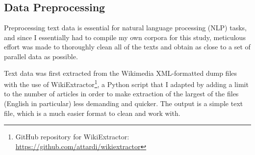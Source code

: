 \documentclass[12pt,a4paper]{article}
\numberwithin{figure}{section}
\numberwithin{table}{section}
\numberwithin{definition}{section}
\begin{document}
\subsection{Data Preprocessing}
\label{ssec:datapreprocessing}

Preprocessing text data is essential for natural language processing (NLP) tasks, and since I essentially had to compile my own corpora for this study, meticulous effort was made to thoroughly clean all of the texts and obtain as close to a set of parallel data as possible.


Text data was first extracted from the Wikimedia XML-formatted dump files with the use of WikiExtractor\footnote{GitHub repository for WikiExtractor: \url{https://github.com/attardi/wikiextractor}}, a Python script \parencite{Attardi2015wikiextractor} that I adapted by adding a limit to the number of articles in order to make extraction of the largest of the files (English in particular) less demanding and quicker. The output is a simple text file, which is a much easier format to clean and work with. 
\end{document}
